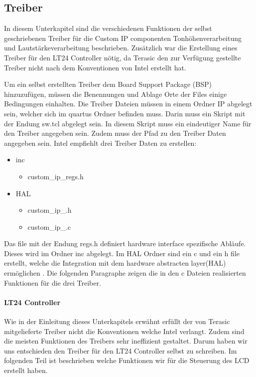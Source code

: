 \subsection{Treiber}\label{subsec:drivers}
In diesem Unterkapitel sind die verschiedenen Funktionen der selbst geschriebenen Treiber für die Custom IP componenten Tonhöhenverarbeitung und Lautstärkeverarbeitung  beschrieben. Zusätzlich war die Erstellung  eines Treiber für den LT24 Controller nötig, da Terasic den zur Verfügung gestellte Treiber nicht nach dem Konventionen von Intel erstellt hat.

Um ein selbst erstellten Treiber dem Board Support Package (BSP) hinzuzufügen, müssen  die Benennungen und Ablage Orte der Files einige Bedingungen einhalten.  
 Die Treiber Dateien müssen in einem Ordner IP abgelegt sein, welcher sich im quartus Ordner befinden muss. Darin muss ein Skript mit der Endung sw.tcl abgelegt sein. In diesem Skript muss ein eindeutiger Name für den Treiber angegeben sein. Zudem muss der Pfad zu den Treiber Daten angegeben sein. Intel empfiehlt drei Treiber Daten zu erstellen:
  \renewcommand{\labelitemi}{$\blacksquare$}
 \renewcommand\labelitemii{$\square$}
 \begin{itemize}
 	\item  inc
 	\begin{itemize}
 		\item  custom\_ip\_regs.h
 	\end{itemize}
 \end{itemize}
 \begin{itemize}
	\item  HAL
	\begin{itemize}
		\item  custom\_ip\_.h
		\item  custom\_ip\_.c
	\end{itemize}
\end{itemize}

  Das file mit der Endung regs.h definiert hardware interface spezifische Abläufe. Dieses wird im Ordner inc abgelegt. Im HAL Ordner sind ein c und ein h file erstellt, welche die Integration mit dem hardware abstracten layer(HAL) ermöglichen \cite{NIOS_II_soft}.
 Die folgenden Paragraphe zeigen die in den c Dateien realisierten Funktionen für die drei Treiber.
\paragraph{LT24 Controller}

Wie in der Einleitung dieses Unterkapitels erwähnt erfüllt der von Terasic mitgelieferte Treiber nicht die Konventionen welche Intel verlangt. Zudem sind die meisten Funktionen des Treibers sehr ineffizient gestaltet. Darum haben wir uns entschieden den Treiber für den LT24 Controller selbst zu schreiben. Im folgenden Teil ist beschrieben welche Funktionen wir für die Steuerung des LCD erstellt haben.

